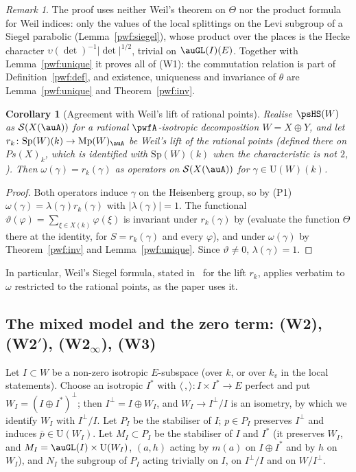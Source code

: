 \documentclass[10pt]{amsart}
\newtheorem{corollary}[theorem]{Corollary}
\theoremstyle{definition}
\theoremstyle{remark}
\newtheorem{remark}[theorem]{Remark}
\providecommand{\auS}{\mathcal S}
\providecommand{\auU}{\mathrm U}
\begin{document}
\begin{remark}\label{pwf:rem-inv}
The proof uses neither Weil's theorem on $\Theta$ nor the product formula for Weil indices: only
the values of the local splittings on the Levi subgroup of a Siegel parabolic
(Lemma~\ref{pwf:siegel}), whose product over the places is the Hecke character
$\upsilon(\det)^{-1}|\det|^{1/2}$, trivial on $\auGL(I)(E)$. Together with Lemma~\ref{pwf:unique}
it proves all of (W1): the commutation relation is part of Definition~\ref{pwf:def}, and existence,
uniqueness and invariance of $\theta$ are Lemma~\ref{pwf:unique} and Theorem~\ref{pwf:inv}.
\end{remark}

\begin{corollary}[Agreement with Weil's lift of rational points]\label{pwf:rk}
Realise $\psHS(W)$ as $\auS(X(\auA))$ for a rational $\pwfA$-isotropic decomposition $W=X\oplus Y$,
and let $r_k\colon\mathrm{Sp}(W)(k)\to\mathrm{Mp}(W)_\auA$ be Weil's lift of the rational points
\cite[no.~40]{WeilActa} (defined there on $Ps(X)_k$, which is identified with $\mathrm{Sp}(W)(k)$ when the
characteristic is not $2$, \cite[p.~181]{WeilActa}). Then $\omega(\gamma)=r_k(\gamma)$ as operators on $\auS(X(\auA))$ for
$\gamma\in\auU(W)(k)$.
\end{corollary}
\begin{proof}
Both operators induce $\gamma$ on the Heisenberg group, so by (P1) $\omega(\gamma)=\lambda(\gamma)
r_k(\gamma)$ with $|\lambda(\gamma)|=1$. The functional $\vartheta(\varphi)=\sum_{\xi\in X(k)}\varphi(\xi)$
is invariant under $r_k(\gamma)$ by \cite[Th\'eor\`eme~6]{WeilActa} (evaluate the function $\Theta$
there at the identity, for $S=r_k(\gamma)$ and every $\varphi$), and under $\omega(\gamma)$ by
Theorem~\ref{pwf:inv} and Lemma~\ref{pwf:unique}. Since $\vartheta\ne0$, $\lambda(\gamma)=1$.
\end{proof}

In particular, Weil's Siegel formula, stated in~\cite[Th\'eor\`eme~5]{WeilSiegel} for the lift $r_k$, applies
verbatim to $\omega$ restricted to the rational points, as the paper uses it.

\subsection{The mixed model and the zero term: (W2), (W2$'$), (W2$_\infty$), (W3)}\label{pwf:ss-mixed}

Let $I\subset W$ be a non-zero isotropic $E$-subspace (over $k$, or over $k_v$ in the local
statements). Choose an isotropic $I^*$ with $\langle\,,\rangle\colon I\times I^*\to E$ perfect and
put $W_I=(I\oplus I^*)^\perp$; then $I^\perp=I\oplus W_I$, and $W_I\to I^\perp/I$ is an isometry, by
which we identify $W_I$ with $I^\perp/I$. Let $P_I$ be the stabiliser of $I$; $p\in P_I$ preserves
$I^\perp$ and induces $\bar p\in\auU(W_I)$. Let $M_I\subset P_I$ be the stabiliser of $I$ and $I^*$
(it preserves $W_I$, and $M_I=\auGL(I)\times\auU(W_I)$, $(a,h)$ acting by $m(a)$ on $I\oplus I^*$ and
by $h$ on $W_I$), and $N_I$ the subgroup of $P_I$ acting trivially on $I$, on $I^\perp/I$ and on
$W/I^\perp$.
\end{document}
